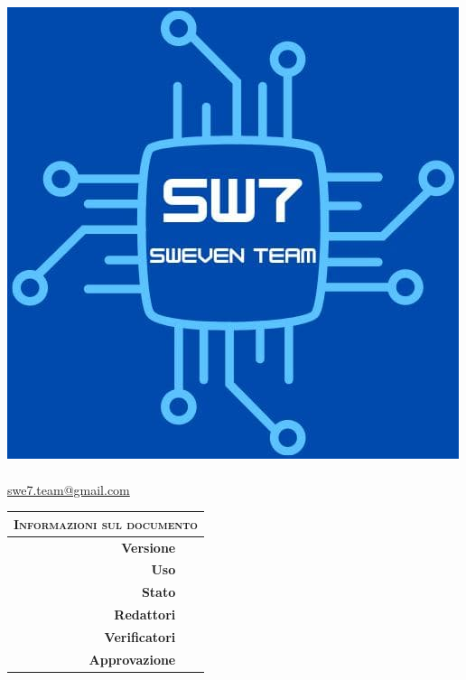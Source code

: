 \documentclass[12pt, a4paper,table]{article}
\title{\textsc{\docNome} \\ \textsc{\docNomeProgetto}}
\author{}
\date{}
\begin{document}
	\maketitle
	\vspace{-3em}
	\begin{center}
	\includegraphics[scale=0.50]{images/logo.jpg} \\
	\vspace{2em}
	\huge \textsc{\docNomeTeam}\\
	\normalsize \href{mailto:swe7.team@gmail.com}{swe7.team@gmail.com}\\
	\vspace{2em}
	\begin{tabular}{r|l}
		\multicolumn{2}{c}{ \textsc{Informazioni sul documento} } \\
		\hline
		\textbf{Versione}     & \docVersione\\
		\textbf{Uso}          & \docUso\\
		\textbf{Stato}        & \docStatus\\
		\textbf{Redattori}    & \docRedattori\\
		\textbf{Verificatori} & \docVerificatori\\
		\textbf{Approvazione} & \docApprovazione\\
	\end{tabular}
	\end{center}
	\thispagestyle{empty}   
	\newpage
\end{document}
